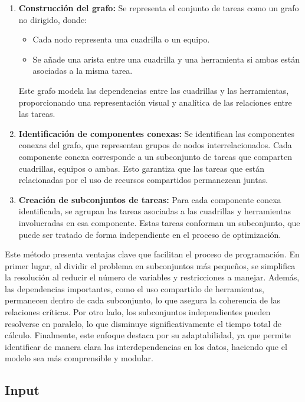 \documentclass{article}
\begin{document}
\begin{enumerate}[label=\alph*.]
    \item \textbf{Construcción del grafo:}  
    Se representa el conjunto de tareas como un grafo no dirigido, donde:
    \begin{itemize}
        \item Cada nodo representa una cuadrilla o un equipo.
        \item Se añade una arista entre una cuadrilla y una herramienta si ambas están asociadas a la misma tarea.
    \end{itemize}
    Este grafo modela las dependencias entre las cuadrillas y las herramientas, proporcionando una representación visual y analítica de las relaciones entre las tareas.
    
    \item \textbf{Identificación de componentes conexas:}  
    Se identifican las componentes conexas del grafo, que representan grupos de nodos interrelacionados. Cada componente conexa corresponde a un subconjunto de tareas que comparten cuadrillas, equipos o ambas. Esto garantiza que las tareas que están relacionadas por el uso de recursos compartidos permanezcan juntas.
    
    \item \textbf{Creación de subconjuntos de tareas:}  
    Para cada componente conexa identificada, se agrupan las tareas asociadas a las cuadrillas y herramientas involucradas en esa componente. Estas tareas conforman un subconjunto, que puede ser tratado de forma independiente en el proceso de optimización.

\end{enumerate}


Este método presenta ventajas clave que facilitan el proceso de programación. En primer lugar, al dividir el problema en subconjuntos más pequeños, se simplifica la resolución al reducir el número de variables y restricciones a manejar. Además, las dependencias importantes, como el uso compartido de herramientas, permanecen dentro de cada subconjunto, lo que asegura la coherencia de las relaciones críticas. Por otro lado, los subconjuntos independientes pueden resolverse en paralelo, lo que disminuye significativamente el tiempo total de cálculo. Finalmente, este enfoque destaca por su adaptabilidad, ya que permite identificar de manera clara las interdependencias en los datos, haciendo que el modelo sea más comprensible y modular.


\subsection{Input}
\end{document}
